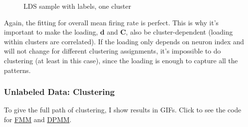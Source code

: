 \documentclass[]{article}
\begin{document}
\begin{figure}[h!]
	\caption{LDS sample with labels, one cluster}
	\label{fig:LDS labeled one cluster}
\end{figure}

Again, the fitting for overall mean firing rate is perfect. This is why it's important to make the loading, \(\mathbf{d}\) and \(\mathbf{C}\), also be cluster-dependent (loading within clusters are correlated). If the loading only depends on neuron index and will not change for different clustering assignments, it's impossible to do clustering (at least in this case), since the loading is enough to capture all the patterns.

\subsubsection{Unlabeled Data: Clustering}
To give the full path of clustering, I show results in GIFs. Click to see the code for \href{https://github.com/weigcdsb/state-space-clustering/blob/main/LDS/lds_sample_MM.m}{FMM} and \href{https://github.com/weigcdsb/state-space-clustering/blob/main/LDS/lds_sample_DP.m}{DPMM}.
\end{document}
